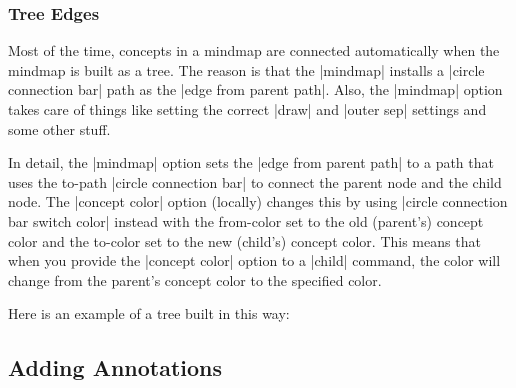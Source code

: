 \subsubsection{Tree Edges}

Most of the time, concepts in a mindmap are connected automatically when the
mindmap is built as a tree. The reason is that the |mindmap| installs a
|circle connection bar| path as the |edge from parent path|. Also, the
|mindmap| option takes care of things like setting the correct |draw| and
|outer sep| settings and some other stuff.

In detail, the |mindmap| option sets the |edge from parent path| to a path that
uses the to-path |circle connection bar| to connect the parent node and the
child node. The |concept color| option (locally) changes this by using
|circle connection bar switch color| instead with the from-color set to the old
(parent's) concept color and the to-color set to the new (child's) concept
color. This means that when you provide the |concept color| option to a |child|
command, the color will change from the parent's concept color to the specified
color.

Here is an example of a tree built in this way:
%
\begin{codeexample}[preamble={\usetikzlibrary{mindmap}}]
\end{codeexample}


\subsection{Adding Annotations}


